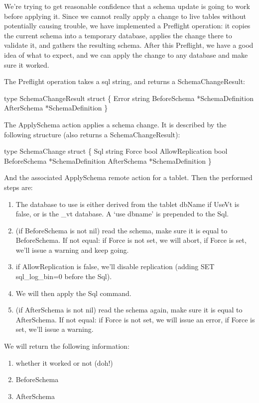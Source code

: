 We’re trying to get reasonable confidence that a schema update is going to work before applying it. Since we cannot really apply a change to live tables without potentially causing trouble, we have implemented a Preflight operation: it copies the current schema into a temporary database, applies the change there to validate it, and gathers the resulting schema. After this Preflight, we have a good idea of what to expect, and we can apply the change to any database and make sure it worked.

The Preflight operation takes a sql string, and returns a SchemaChangeResult:
\begin{codesample4}
     type SchemaChangeResult struct \{
         Error        string
         BeforeSchema *SchemaDefinition
         AfterSchema  *SchemaDefinition
     \}
\end{codesample4}

The ApplySchema action applies a schema change. It is described by the following structure (also returns a SchemaChangeResult):
\begin{codesample4}
    type SchemaChange struct \{
     Sql              string
     Force            bool
     AllowReplication bool
     BeforeSchema     *SchemaDefinition
     AfterSchema      *SchemaDefinition
    \}
\end{codesample4}

And the associated ApplySchema remote action for a tablet. Then the performed steps are:
\begin{enumerate}
\item The database to use is either derived from the tablet dbName if UseVt is false, or is the \_vt database. A ‘use dbname’ is prepended to the Sql.
\item (if BeforeSchema is not nil) read the schema, make sure it is equal to BeforeSchema. If not equal: if Force is not set, we will abort, if Force is set, we’ll issue a warning and keep going.
\item if AllowReplication is false, we’ll disable replication (adding SET sql\_log\_bin=0 before the Sql).
\item We will then apply the Sql command.
\item (if AfterSchema is not nil) read the schema again, make sure it is equal to AfterSchema. If not equal: if Force is not set, we will issue an error, if Force is set, we’ll issue a warning.
\end{enumerate}

We will return the following information:
\begin{enumerate}
\item whether it worked or not (doh!)
\item BeforeSchema
\item  AfterSchema
\end{enumerate}


